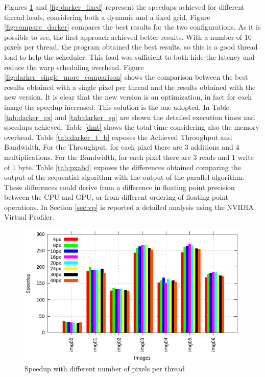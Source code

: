 \documentclass[a4paper]{article}
\begin{document}
Figures \ref{fig:darker_try_histo} and \ref{fig:darker_fixed} represent the speedups achieved for different thread loads, considering both a dynamic and a fixed grid. Figure \ref{fig:compare_darker} compares the best results for the two configurations. As it is possible to see, the first approach achieved better results. With a number of 10 pixels per thread, the program obtained the best results, so this is a good thread load to help the scheduler. This load was sufficient to both hide the latency and reduce the warp scheduling overhead. Figure \ref{fig:darker_single_more_comparison} shows the comparison between the best results obtained with a single pixel per thread and the results obtained with the new version. It is clear that the new version is an optimization, in fact for each image the speedup increased. This solution is the one adopted. In Table \ref{tab:darker_ex} and \ref{tab:darker_sp} are shown the detailed execution times and speedups achieved. Table \ref{dmt} shows the total time considering also the memory overhead. Table \ref{tab:darker_t_b} exposes the Achieved Throughput and Bandwidth. For the Throughput, for each pixel there are 3 additions and 4 multiplications. For the Bandwidth, for each pixel there are 3 reads and 1 write of 1 byte.  Table \ref{tab:pxabd} exposes the differences obtained comparing the output of the sequential algorithm with the output of the parallel algorithm. These differences could derive from a difference in floating point precision between the CPU and GPU, or from different ordering of floating point operations. In Section \ref{sec:vp} is reported a detailed analysis using the NVIDIA Virtual Profiler.
    
\begin{figure}[!ht]
    \centering
    \includegraphics[width=0.8\linewidth]{res/new/darker_try_histo}
    \caption{Speedup with different number of pixels per thread}
    \label{fig:darker_try_histo}
\end{figure}
\FloatBarrier
\end{document}
